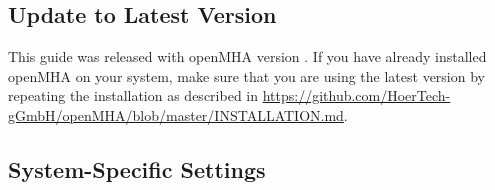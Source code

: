 \documentclass[11pt,a4paper,twoside]{article}
\newcommand{\+}{\discretionary{\mbox{\scriptsize$\hookleftarrow$}}{}{}}
\begin{document}

\subsection{Update to Latest Version}

This guide was released with openMHA version \MHAversion.
If you have already installed openMHA on your system, make
sure that you are using the latest version by repeating the installation
as described in
\url{https://github.com/HoerTech-gGmbH/openMHA/blob/master/INSTALLATION.md}.

\subsection{System-Specific Settings}
\end{document}
